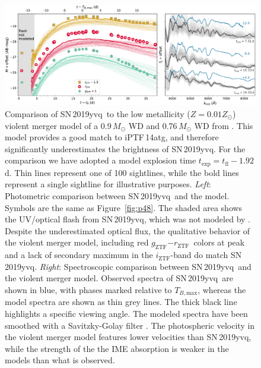\documentclass[twocolumn]{aastex63}
\newcommand{\rztf}{$r_\mathrm{ZTF}$}
\newcommand{\gztf}{$g_\mathrm{ZTF}$}
\newcommand{\iztf}{$i_\mathrm{ZTF}$}
\newcommand{\tbmax}{$T_{B,\mathrm{max}}$}
\newcommand{\sn}{SN\,2019yvq}
\begin{document}
\begin{figure}
    \centering
    \includegraphics[width=\textwidth]{./figures/violent_merger.pdf}
    \caption{Comparison of \sn\ to the low metallicity ($Z = 0.01 Z_\odot$)
    violent merger model of a 0.9\,$M_\odot$ WD and 0.76\,$M_\odot$ WD from
    \citet{Kromer16}. This model provides a good match to iPTF\,14atg, and
    therefore significantly underestimates the brightness of \sn. For the
    comparison we have adopted a model explosion time $t_\mathrm{exp} =
    t_\mathrm{fl} - 1.92$\,d. Thin lines represent one of 100 sightlines,
    while the bold lines represent a single sightline for illustrative
    purposes. \textit{Left}: Photometric comparison between \sn\ and the
    model. Symbols are the same as Figure~\ref{fig:p48}. The shaded area shows
    the UV/optical flash from \sn, which was not modeled by \citet{Kromer16}.
    Despite the underestimated optical flux, the qualitative behavior of the
    violent merger model, including red \gztf$ - $\rztf\ colors at peak and a
    lack of secondary maximum in the \iztf-band do match \sn. \textit{Right}:
    Spectroscopic comparison between \sn\ and the violent merger model.
    Observed spectra of \sn\ are shown in blue, with phases marked relative to
    \tbmax, whereas the model spectra are shown as thin grey lines. The thick
    black line highlights a specific viewing angle. The modeled spectra have
    been smoothed with a Savitzky-Golay filter \citep{Savitzky64}. The
    photospheric velocity in the violent merger model features lower
    velocities than \sn, while the strength of the the IME absorption is
    weaker in the models than what is observed.}
    \label{fig:violent_merger}
\end{figure}
\end{document}
